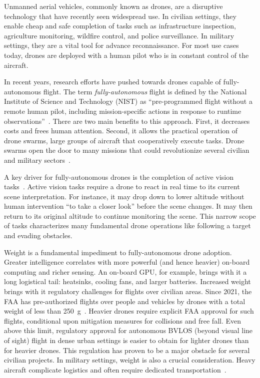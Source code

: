 \label{sec:introduction}
Unmanned aerial vehicles, commonly known as drones, are a disruptive technology that have recently seen widespread use. In civilian settings, they enable cheap and safe completion of tasks such as infrastructure inspection, agriculture monitoring, wildfire control, and police surveillance. In military settings, they are a vital tool for advance reconnaissance. For most use cases today, drones are deployed with a human pilot who is in constant control of the aircraft.

In recent years, research efforts have pushed towards drones capable of fully-autonomous flight. The term \textit{fully-autonomous} flight is defined by the National Institute of Science and Technology (NIST) as “pre-programmed flight without a remote human pilot, including mission-specific actions in response to runtime observations”~\cite{Huang2008}. There are two main benefits to this approach. First, it decreases costs and frees human attention. Second, it allows the practical operation of drone swarms, large groups of aircraft that cooperatively execute tasks. Drone swarms open the door to many missions that could revolutionize several civilian and military sectors~\cite{Burkle2009}. 

A key driver for fully-autonomous drones is the completion of active vision tasks~\cite{Aloimonos1988, Ognibene2013}. Active vision tasks require a drone to react in real time to its current scene interpretation. For instance, it may drop down to lower altitude without human intervention ``to take a closer look'' before the scene changes.  It may then return to its original altitude to continue monitoring the scene. This narrow scope of tasks characterizes many fundamental drone operations like following a target and evading obstacles.

Weight is a fundamental impediment to fully-autonomous drone adoption. Greater intelligence correlates with more powerful (and hence heavier) on-board computing and richer sensing. An on-board GPU, for example, brings with it a long logistical tail: heatsinks, cooling fans, and larger batteries. Increased weight brings with it regulatory challenges for flights over civilian areas. Since 2021, the FAA has pre-authorized flights over people and vehicles by drones with a total weight of less than 250~g~\cite{FAA2021}. Heavier drones require explicit FAA approval for such flights, conditional upon mitigation measures for collisions and free fall. Even above this limit, regulatory approval for autonomous BVLOS (beyond visual line of sight) flight in dense urban settings is easier to obtain for lighter drones than for heavier drones. This regulation has proven to be a major obstacle for several civilian projects. In military settings, weight is also a crucial consideration. Heavy aircraft complicate logistics and often require dedicated transportation~\cite{DefensePost}. 

